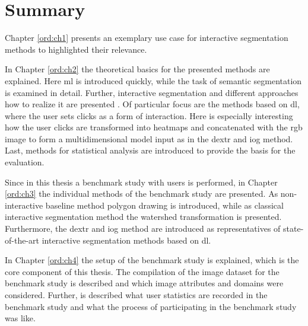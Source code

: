 
\section{Summary}



Chapter \ref{ord:ch1} presents an exemplary use case for interactive segmentation methods to highlighted their relevance.

In Chapter \ref{ord:ch2} the theoretical basics for the presented methods are explained.
Here \gls{ml} is introduced quickly, while the task of semantic segmentation is examined in detail.
Further, interactive segmentation and different approaches how to realize it are presented .
Of particular focus are the methods based on \gls{dl}, where the user sets clicks as a form of interaction.
Here is especially interesting how the user clicks are transformed into heatmaps and concatenated with the \gls{rgb} image to form a multidimensional model input as in the \gls{dextr} and \gls{iog} method.
Last, methods for statistical analysis are introduced to provide the basis for the evaluation.

Since in this thesis a benchmark study with users is performed, in Chapter \ref{ord:ch3} the individual methods of the benchmark study are presented.
As non-interactive baseline method polygon drawing is introduced, while as classical interactive segmentation method the watershed transformation is presented.
Furthermore, the \gls{dextr} \cite{Man18-DEXTR} and \gls{iog} \cite{Zha20-IOG} method are introduced as representatives of state-of-the-art interactive segmentation methods based on \gls{dl}.

In Chapter \ref{ord:ch4} the setup of the benchmark study is explained, which is the core component of this thesis.
The compilation of the image dataset for the benchmark study is described and which image attributes and domains were considered.
Further, is described what user statistics are recorded in the benchmark study and what the process of participating in the benchmark study was like.

